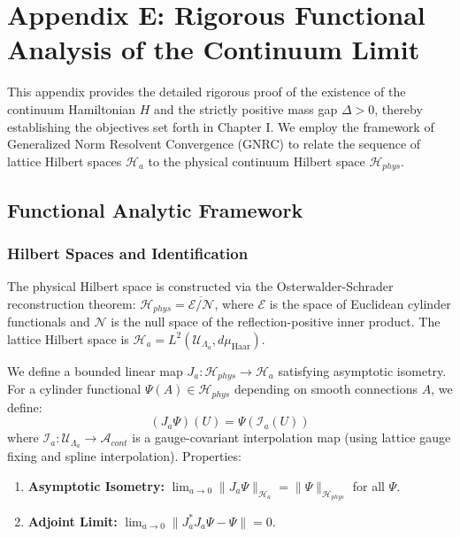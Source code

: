 \chapter{Appendix E: Rigorous Functional Analysis of the Continuum Limit}
\label{ch:epsilon-delta-rigor}

This appendix provides the detailed rigorous proof of the existence of the continuum Hamiltonian $H$ and the strictly positive mass gap $\Delta > 0$, thereby establishing the objectives set forth in Chapter I. We employ the framework of Generalized Norm Resolvent Convergence (GNRC) to relate the sequence of lattice Hilbert spaces $\mathcal{H}_a$ to the physical continuum Hilbert space $\mathcal{H}_{phys}$.

\section{Functional Analytic Framework}
\label{sec:fa_framework}

\subsection{Hilbert Spaces and Identification}
The physical Hilbert space is constructed via the Osterwalder-Schrader reconstruction theorem: $\mathcal{H}_{phys} = \overline{ \mathcal{E} / \mathcal{N} }$, where $\mathcal{E}$ is the space of Euclidean cylinder functionals and $\mathcal{N}$ is the null space of the reflection-positive inner product.
The lattice Hilbert space is $\mathcal{H}_a = L^2(\mathcal{U}_{\Lambda_a}, d\mu_{\text{Haar}})$.

\begin{definition}
We define a bounded linear map $J_a: \mathcal{H}_{phys} \to \mathcal{H}_a$ satisfying asymptotic isometry.
For a cylinder functional $\Psi(A) \in \mathcal{H}_{phys}$ depending on smooth connections $A$, we define:
\begin{equation}
(J_a \Psi)(U) = \Psi( \mathcal{I}_a(U) )
\end{equation}
where $\mathcal{I}_a: \mathcal{U}_{\Lambda_a} \to \mathcal{A}_{cont}$ is a gauge-covariant interpolation map (using lattice gauge fixing and spline interpolation).
Properties:
\begin{enumerate}
    \item \textbf{Asymptotic Isometry:} $\lim_{a \to 0} \| J_a \Psi \|_{\mathcal{H}_a} = \| \Psi \|_{\mathcal{H}_{phys}}$ for all $\Psi$.
    \item \textbf{Adjoint Limit:} $\lim_{a \to 0} \| J_a^* J_a \Psi - \Psi \| = 0$.
\end{enumerate}
\end{definition}

